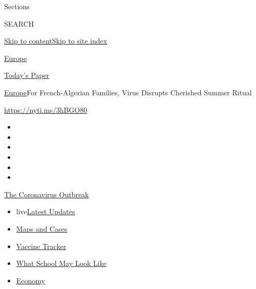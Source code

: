Sections

SEARCH

\protect\hyperlink{site-content}{Skip to
content}\protect\hyperlink{site-index}{Skip to site index}

\href{https://www.nytimes3xbfgragh.onion/section/world/europe}{Europe}

\href{https://myaccount.nytimes3xbfgragh.onion/auth/login?response_type=cookie\&client_id=vi}{}

\href{https://www.nytimes3xbfgragh.onion/section/todayspaper}{Today's
Paper}

\href{/section/world/europe}{Europe}\textbar{}For French-Algerian
Families, Virus Disrupts Cherished Summer Ritual

\url{https://nyti.ms/3hBGO80}

\begin{itemize}
\item
\item
\item
\item
\item
\item
\end{itemize}

\href{https://www.nytimes3xbfgragh.onion/news-event/coronavirus?action=click\&pgtype=Article\&state=default\&region=TOP_BANNER\&context=storylines_menu}{The
Coronavirus Outbreak}

\begin{itemize}
\tightlist
\item
  live\href{https://www.nytimes3xbfgragh.onion/2020/08/02/world/coronavirus-updates.html?action=click\&pgtype=Article\&state=default\&region=TOP_BANNER\&context=storylines_menu}{Latest
  Updates}
\item
  \href{https://www.nytimes3xbfgragh.onion/interactive/2020/us/coronavirus-us-cases.html?action=click\&pgtype=Article\&state=default\&region=TOP_BANNER\&context=storylines_menu}{Maps
  and Cases}
\item
  \href{https://www.nytimes3xbfgragh.onion/interactive/2020/science/coronavirus-vaccine-tracker.html?action=click\&pgtype=Article\&state=default\&region=TOP_BANNER\&context=storylines_menu}{Vaccine
  Tracker}
\item
  \href{https://www.nytimes3xbfgragh.onion/interactive/2020/07/29/us/schools-reopening-coronavirus.html?action=click\&pgtype=Article\&state=default\&region=TOP_BANNER\&context=storylines_menu}{What
  School May Look Like}
\item
  \href{https://www.nytimes3xbfgragh.onion/live/2020/07/31/business/stock-market-today-coronavirus?action=click\&pgtype=Article\&state=default\&region=TOP_BANNER\&context=storylines_menu}{Economy}
\end{itemize}

